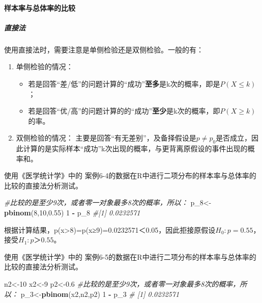 \documentclass[
]{article}
\newenvironment{Shaded}{\begin{snugshade}}{\end{snugshade}}
\newcommand{\CommentTok}[1]{\textcolor[rgb]{0.56,0.35,0.01}{\textit{#1}}}
\newcommand{\DecValTok}[1]{\textcolor[rgb]{0.00,0.00,0.81}{#1}}
\newcommand{\FloatTok}[1]{\textcolor[rgb]{0.00,0.00,0.81}{#1}}
\newcommand{\KeywordTok}[1]{\textcolor[rgb]{0.13,0.29,0.53}{\textbf{#1}}}
\newcommand{\NormalTok}[1]{#1}
\newcommand{\OperatorTok}[1]{\textcolor[rgb]{0.81,0.36,0.00}{\textbf{#1}}}
\newcommand{\StringTok}[1]{\textcolor[rgb]{0.31,0.60,0.02}{#1}}
\providecommand{\tightlist}{%
  \setlength{\itemsep}{0pt}\setlength{\parskip}{0pt}}
\begin{document}
\hypertarget{ux6837ux672cux7387ux4e0eux603bux4f53ux7387ux7684ux6bd4ux8f83}{%
\paragraph{样本率与总体率的比较}\label{ux6837ux672cux7387ux4e0eux603bux4f53ux7387ux7684ux6bd4ux8f83}}

\hypertarget{ux76f4ux63a5ux6cd5}{%
\subparagraph{直接法}\label{ux76f4ux63a5ux6cd5}}

使用直接法时，需要注意是单侧检验还是双侧检验。一般的有：

\begin{enumerate}
\def\labelenumi{\arabic{enumi}.}
\tightlist
\item
  单侧检验的情况：

  \begin{itemize}
  \tightlist
  \item
    若是回答``差/低''的问题计算的``成功''\textbf{至多}是k次的概率，即是\(P(X≤k)\)；
  \item
    若是回答``优/高''的问题计算的的``成功''\textbf{至少}是k次的概率，即\(P(X≥k)\)的率。
  \end{itemize}
\item
  双侧检验的情况：
  主要是回答``有无差别''，及备择假设是\(p≠p_0\)是否成立，因此计算的是实际样本``成功''k次出现的概率，与更背离原假设的事件出现的概率和。
\end{enumerate}

使用《医学统计学》中的 案例6-4的数据在R中进行二项分布的样本率与总体率的比较的直接法分析测试。

\begin{Shaded}
\begin{Highlighting}[]
\CommentTok{#比较的是至少9次，或者零一对象最多8次的概率，所以：}
\NormalTok{p_}\DecValTok{8}\NormalTok{<-}\KeywordTok{pbinom}\NormalTok{(}\DecValTok{8}\NormalTok{,}\DecValTok{10}\NormalTok{,}\FloatTok{0.55}\NormalTok{)}
\DecValTok{1} \OperatorTok{-}\StringTok{ }\NormalTok{p_}\DecValTok{8}
\CommentTok{#[1] 0.0232571}
\end{Highlighting}
\end{Shaded}

根据计算结果，p(x\textgreater8)=p(x≥9)=0.0232571＜0.05，因此拒接原假设\(H_0:p=0.55\)，接受\(H_1:p＞0.55\)。

使用《医学统计学》中的 案例6-5的数据在R中进行二项分布的样本率与总体率的比较的直接法分析测试。

\begin{Shaded}
\begin{Highlighting}[]
\NormalTok{n2<-}\DecValTok{10}
\NormalTok{x2<-}\DecValTok{9}
\NormalTok{p2<-}\FloatTok{0.6}
\CommentTok{#比较的是至少9次，或者零一对象最多8次的概率，所以：}
\NormalTok{p_}\DecValTok{3}\NormalTok{<-}\KeywordTok{pbinom}\NormalTok{(x2,n2,p2)}
\DecValTok{1} \OperatorTok{-}\StringTok{ }\NormalTok{p_}\DecValTok{3}
\CommentTok{# [1] 0.0232571}
\end{Highlighting}
\end{Shaded}
\end{document}

